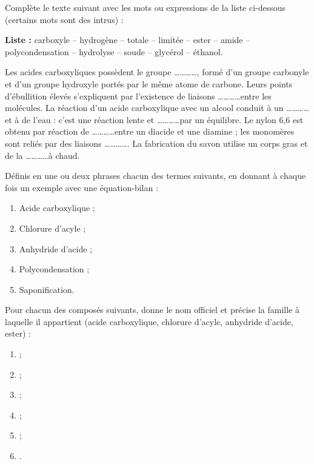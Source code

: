 \documentclass[11pt]{article}
\newcounter{popsec}
\newcounter{popsub}
\newcommand{\courssub}[1]{%
  \stepcounter{popsub}%
  \par\vspace{9pt}\noindent{\popxbold\fontsize{11.5}{13}\selectfont\color{popink}{\color{poporange}\thepopsec.\thepopsub}\hspace{6pt}#1}\par\nopagebreak\vspace{4pt}
}
\begin{document}
\begin{exercice}
Complète le texte suivant avec les mots ou expressions de la liste ci-dessous (certains mots sont des intrus) :

\smallskip
\textbf{Liste :} carboxyle -- hydrogène -- totale -- limitée -- ester -- amide -- polycondensation -- hydrolyse -- soude -- glycérol -- éthanol.

\smallskip
Les acides carboxyliques possèdent le groupe \ldots\ldots\ldots\ldots, formé d'un groupe carbonyle et d'un groupe hydroxyle portés par le même atome de carbone. Leurs points d'ébullition élevés s'expliquent par l'existence de liaisons \ldots\ldots\ldots\ldots entre les molécules. La réaction d'un acide carboxylique avec un alcool conduit à un \ldots\ldots\ldots\ldots et à de l'eau : c'est une réaction lente et \ldots\ldots\ldots\ldots par un équilibre. Le nylon 6,6 est obtenu par réaction de \ldots\ldots\ldots\ldots entre un diacide et une diamine ; les monomères sont reliés par des liaisons \ldots\ldots\ldots\ldots. La fabrication du savon utilise un corps gras et de la \ldots\ldots\ldots\ldots à chaud.
\end{exercice}

\begin{exercice}
Définis en une ou deux phrases chacun des termes suivants, en donnant à chaque fois un exemple avec une équation-bilan :
\begin{enumerate}
\item Acide carboxylique ;
\item Chlorure d'acyle ;
\item Anhydride d'acide ;
\item Polycondensation ;
\item Saponification.
\end{enumerate}
\end{exercice}

\courssub{Je m'entraîne}

\begin{exercice}
Pour chacun des composés suivants, donne le nom officiel et précise la famille à laquelle il appartient (acide carboxylique, chlorure d'acyle, anhydride d'acide, ester) :
\begin{enumerate}
\item {} ;
\item {} ;
\item {} ;
\item {} ;
\item {} ;
\item {}.
\end{enumerate}
\end{exercice}
\end{document}
